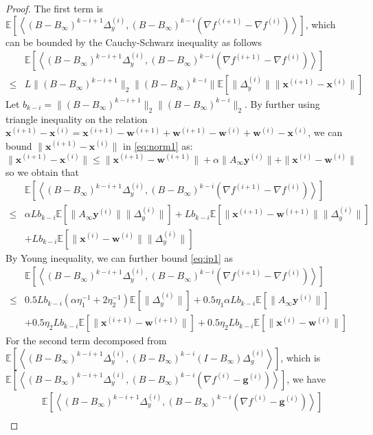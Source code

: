 \documentclass{article}
\newcommand{\vg}{{\mathbf{g}}}
\newcommand{\vw}{{\mathbf{w}}}
\newcommand{\vx}{{\mathbf{x}}}
\newcommand{\vy}{{\mathbf{y}}}
\newcommand{\EE}[1]{\mathbb{E}\left[#1\right]}
\newcommand{\norm}[1]{\| #1 \|}
\newcommand{\ip}[1]{\left\langle#1\right\rangle}
\begin{document}
\begin{proof}
The first term is $\EE{\ip{(B-B_{\infty})^{k-i+1}\Delta_y^{(i)}, (B-B_{\infty})^{k-i}(\nabla f^{(i+1)}-\nabla f^{(i)})}}$, which can be bounded by the Cauchy-Schwarz inequality as follows
\begin{align}
  &\EE{\ip{(B-B_{\infty})^{k-i+1}\Delta_y^{(i)}, (B-B_{\infty})^{k-i}(\nabla f^{(i+1)}-\nabla f^{(i)})}}\nonumber\\ 
  \leq & L\norm{(B-B_{\infty})^{k-i+1}}_2\norm{(B-B_{\infty})^{k-i}}\EE{\norm{\Delta_y^{(i)}}\norm{\vx^{(i+1)}-\vx^{(i)}}}\label{eq:norm1}
\end{align}
Let $b_{k-i}=\norm{(B-B_{\infty})^{k-i+1}}_2\norm{(B-B_{\infty})^{k-i}}_2$. By further using triangle inequality on the relation $\vx^{(i+1)}-\vx^{(i)}=\vx^{(i+1)}-\vw^{(i+1)}+\vw^{(i+1)}-\vw^{(i)}+\vw^{(i)} -\vx^{(i)}$, we can bound $\norm{\vx^{(i+1)}-\vx^{(i)}}$ in \ref{eq:norm1} as:
$$\norm{\vx^{(i+1)}-\vx^{(i)}}\leq \norm{\vx^{(i+1)}-\vw^{(i+1)}}+ \alpha \norm{A_{\infty}\vy^{(i)}}+\norm{\vx^{(i)}-\vw^{(i)}}$$
so we obtain that 
\begin{align}
  &\EE{\ip{(B-B_{\infty})^{k-i+1}\Delta_y^{(i)}, (B-B_{\infty})^{k-i}(\nabla f^{(i+1)}-\nabla f^{(i)})}} \label{eq:ip1} \\
  \leq & \alpha L b_{k-i}\EE{\norm{A_{\infty}\vy^{(i)}}\norm{\Delta_y^{(i)}}}+L b_{k-i} \EE{\norm{\vx^{(i+1)}-\vw^{(i+1)}}\norm{\Delta_y^{(i)}}}\nonumber \\
  &+ L b_{k-i} \EE{\norm{\vx^{(i)}-\vw^{(i)}}\norm{\Delta_y^{(i)}}}\nonumber
\end{align}
By Young inequality, we can further bound \ref{eq:ip1} as
\begin{align}
  &\EE{\ip{(B-B_{\infty})^{k-i+1}\Delta_y^{(i)}, (B-B_{\infty})^{k-i}(\nabla f^{(i+1)}-\nabla f^{(i)})}}\nonumber \\ 
  \leq & 0.5 L b_{k-i}(\alpha\eta_1^{-1}+2\eta_2^{-1})\EE{\norm{\Delta_y^{(i)}}}+0.5\eta_1\alpha L b_{k-i}\EE{\norm{A_{\infty}\vy^{(i)}}}\nonumber\\&+0.5\eta_2 L b_{k-i} \EE{\norm{\vx^{(i+1)}-\vw^{(i+1)}}}+0.5\eta_2 L b_{k-i} \EE{\norm{\vx^{(i)}-\vw^{(i)}}}\label{first term}
\end{align}
For the second term decomposed from $\EE{\ip{(B-B_{\infty})^{k-i+1}\Delta_y^{(i)}, (B-B_{\infty})^{k-i}(I-B_{\infty})\Delta_g^{(i)}}}$, which is $\EE{\ip{(B-B_{\infty})^{k-i+1}\Delta_y^{(i)}, (B-B_{\infty})^{k-i}(\nabla f^{(i)}-\vg^{(i)})}}$, we have
\begin{align*}
  &\EE{\ip{(B-B_{\infty})^{k-i+1}\Delta_y^{(i)}, (B-B_{\infty})^{k-i}(\nabla f^{(i)}-\vg^{(i)})}}\\ 

\end{align*}
\end{proof}
\end{document}
